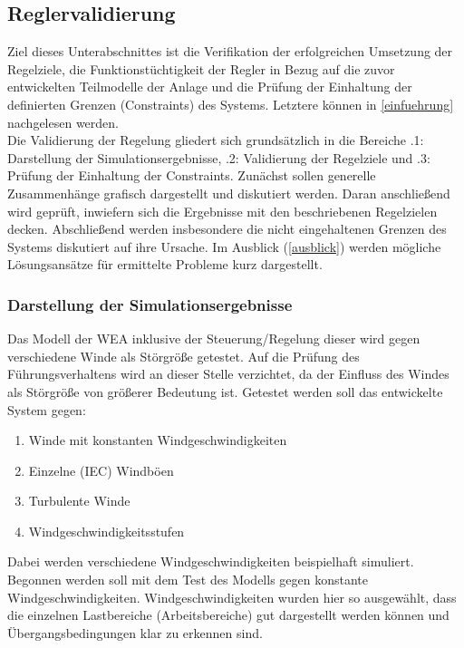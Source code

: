 \subsection{Reglervalidierung} \label{reglervalidierung}

Ziel dieses Unterabschnittes ist die Verifikation der erfolgreichen Umsetzung der Regelziele, die Funktionstüchtigkeit der Regler in Bezug auf die zuvor entwickelten Teilmodelle der Anlage und die Prüfung der Einhaltung der definierten Grenzen (Constraints) des Systems. Letztere können in \autoref{einfuehrung} nachgelesen werden. \\
Die Validierung der Regelung gliedert sich grundsätzlich in die Bereiche .1: Darstellung der Simulationsergebnisse\grqq{}, .2: Validierung der Regelziele\grqq{} und .3: Prüfung der Einhaltung der Constraints\grqq{}. Zunächst sollen generelle Zusammenhänge grafisch dargestellt und diskutiert werden. Daran anschließend wird geprüft, inwiefern sich die Ergebnisse mit den beschriebenen Regelzielen decken. Abschließend werden insbesondere die nicht eingehaltenen Grenzen des Systems diskutiert auf ihre Ursache. Im Ausblick (\autoref{ausblick}) werden mögliche Lösungsansätze für ermittelte Probleme kurz dargestellt.

\subsubsection{Darstellung der Simulationsergebnisse}

Das Modell der WEA inklusive der Steuerung/Regelung dieser wird gegen verschiedene Winde als Störgröße getestet. Auf die Prüfung des Führungsverhaltens wird an dieser Stelle verzichtet, da der Einfluss des Windes als Störgröße von größerer Bedeutung ist. Getestet werden soll das entwickelte System gegen:
\begin{enumerate}
    \item Winde mit konstanten Windgeschwindigkeiten
    \item Einzelne (IEC) Windböen
    \item Turbulente Winde
    \item Windgeschwindigkeitsstufen
\end{enumerate}

Dabei werden verschiedene Windgeschwindigkeiten beispielhaft simuliert. Begonnen werden soll mit dem Test des Modells gegen konstante Windgeschwindigkeiten. Windgeschwindigkeiten wurden hier so ausgewählt, dass die einzelnen Lastbereiche (Arbeitsbereiche) gut dargestellt werden können und Übergangsbedingungen klar zu erkennen sind.\\

